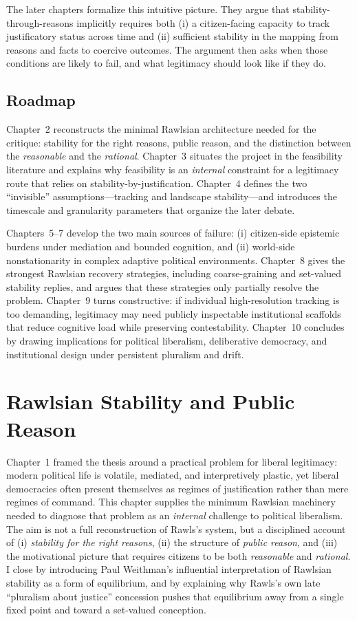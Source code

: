 \documentclass[12pt]{report}
\begin{document}
The later chapters formalize this intuitive picture.  They argue that stability-through-reasons implicitly requires both (i) a citizen-facing capacity to track justificatory status across time and (ii) sufficient stability in the mapping from reasons and facts to coercive outcomes.  The argument then asks when those conditions are likely to fail, and what legitimacy should look like if they do.

\section{Roadmap}

Chapter~2 reconstructs the minimal Rawlsian architecture needed for the critique: stability for the right reasons, public reason, and the distinction between the \emph{reasonable} and the \emph{rational}.  Chapter~3 situates the project in the feasibility literature and explains why feasibility is an \emph{internal} constraint for a legitimacy route that relies on stability-by-justification.  Chapter~4 defines the two ``invisible'' assumptions---tracking and landscape stability---and introduces the timescale and granularity parameters that organize the later debate.

Chapters~5--7 develop the two main sources of failure: (i) citizen-side epistemic burdens under mediation and bounded cognition, and (ii) world-side nonstationarity in complex adaptive political environments.  Chapter~8 gives the strongest Rawlsian recovery strategies, including coarse-graining and set-valued stability replies, and argues that these strategies only partially resolve the problem.  Chapter~9 turns constructive: if individual high-resolution tracking is too demanding, legitimacy may need publicly inspectable institutional scaffolds that reduce cognitive load while preserving contestability.  Chapter~10 concludes by drawing implications for political liberalism, deliberative democracy, and institutional design under persistent pluralism and drift.

\chapter{Rawlsian Stability and Public Reason}

Chapter~1 framed the thesis around a practical problem for liberal legitimacy: modern political life is volatile, mediated, and interpretively plastic, yet liberal democracies often present themselves as regimes of justification rather than mere regimes of command. This chapter supplies the minimum Rawlsian machinery needed to diagnose that problem as an \emph{internal} challenge to political liberalism. The aim is not a full reconstruction of Rawls’s system, but a disciplined account of (i) \emph{stability for the right reasons}, (ii) the structure of \emph{public reason}, and (iii) the motivational picture that requires citizens to be both \emph{reasonable} and \emph{rational}. I close by introducing Paul Weithman’s influential interpretation of Rawlsian stability as a form of equilibrium, and by explaining why Rawls’s own late “pluralism about justice” concession pushes that equilibrium away from a single fixed point and toward a set-valued conception.
\end{document}

